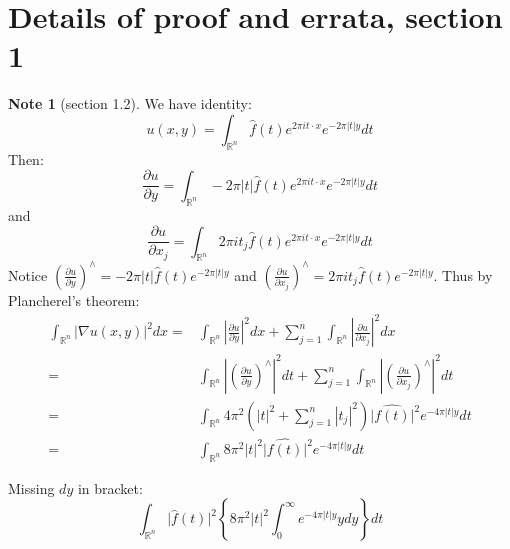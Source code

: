 \documentclass{report}
\theoremstyle{definition}
\newtheorem{note}{Note}
\theoremstyle{definition}
\theoremstyle{plain}
\numberwithin{theorem}{section}
\numberwithin{remark}{section}
\numberwithin{equation}{section}
\newcommand{\abs}[1]{\left\lvert#1\right\rvert}
\newcommand{\absl}[1]{\lvert#1\rvert}
\begin{document}
\section{Details of proof and errata, section 1}
\begin{note}[section 1.2]
    We have identity:
    \begin{equation*}
        u(x,y)=\int_{\mathbb{R}^n}\hat{f}(t)e^{2\pi it\cdot x}e^{-2\pi \abs{t}y}d t
    \end{equation*}
    Then:
    \begin{equation*}
        \frac{\partial u}{\partial y}=\int_{\mathbb{R}^n}-2\pi\abs{t}\hat{f}(t)e^{2\pi it\cdot x}e^{-2\pi \abs{t}y}d t
    \end{equation*}
    and
    \begin{equation*}
        \frac{\partial u}{\partial x_j}=\int_{\mathbb{R}^n}2\pi i{t_j}\hat{f}(t)e^{2\pi it\cdot x}e^{-2\pi \abs{t}y}d t
    \end{equation*}
    Notice $(\frac{\partial u}{\partial y})^\wedge=-2\pi\abs{t}\hat{f}(t)e^{-2\pi \abs{t}y}$ and $(\frac{\partial u}{\partial x_j})^\wedge=2\pi i{t_j}\hat{f}(t)e^{-2\pi \abs{t}y}$. Thus by Plancherel's theorem:
    \begin{align*}
        \int_{\mathbb{R}^n}{\abs{\nabla u(x,y)}^2 dx}= & \int_{\mathbb{R}^n}\abs{\frac{\partial u}{\partial y}}^2 dx+\sum_{j=1}^n\int_{\mathbb{R}^n}\abs{\frac{\partial u}{\partial x_j}}^2 dx                   \\
        =                                              & \int_{\mathbb{R}^n}\abs{(\frac{\partial u}{\partial y})^\wedge}^2 d t+\sum_{j=1}^n\int_{\mathbb{R}^n}\abs{(\frac{\partial u}{\partial x_j})^\wedge}^2 d t \\
        =                                              & \int_{\mathbb{R}^n} 4\pi^2(\abs{t}^2+\sum_{j=1}^n \abs{t_j}^2) \absl{\hat{f(t)}}^2 e^{-4\pi\abs{t}y} d t                                                 \\
        =                                              & \int_{\mathbb{R}^n} 8\pi^2\abs{t}^2\absl{\hat{f(t)}}^2 e^{-4\pi\abs{t}y} d t
    \end{align*}
\end{note}
\begin{errata}[P83]
    Missing $d y$ in bracket:
    \begin{equation*}
        \int_{\mathbb{R}^n}\absl{\hat{f}(t)}^2\left\{ 8\pi^2\abs{t}^2\int_{0}^{\infty}e^{-4\pi\abs{t}y}y d y\right\}d t
    \end{equation*}
\end{errata}
\end{document}
